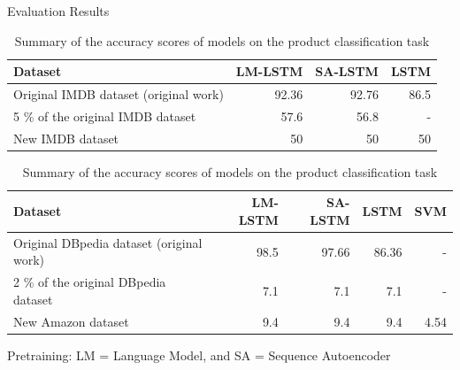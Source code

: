 \documentclass[aspectratio=169,xcolor=dvipsnames]{beamer}
\begin{document}
\begin{frame}{Evaluation Results}
    \tableofcontents

\begin{table}[h!]
    \begin{center}
    
    \caption{Summary of the accuracy scores of models on the IMDB sentiment classification task}
    \label{tab:table1}
    \begin{tabular}{|l|r|r|r|} %
      \hline
      \textbf{Dataset} & \textbf{LM-LSTM} & \textbf{SA-LSTM} & \textbf{LSTM} \\
      \hline
      Original IMDB dataset (original work) & 92.36 & 92.76 & 86.5 \\
      5 \% of the original IMDB dataset & 57.6 & 56.8 & - \\
      New IMDB dataset & 50 & 50 & 50 \\
      \hline
    \end{tabular}
    
    \caption{Summary of the accuracy scores of models on the product classification task}
    \label{tab:table2}
    \begin{tabular}{|l|r|r|r|r|} 
      \hline
      \textbf{Dataset} & \textbf{LM-LSTM} & \textbf{SA-LSTM} & \textbf{LSTM} & \textbf{SVM}\\
      \hline
      Original DBpedia dataset (original work) & 98.5 & 97.66 & 86.36 & -\\
      2 \% of the original DBpedia dataset & 7.1 & 7.1 & 7.1 & - \\
      New Amazon dataset & 9.4 & 9.4 & 9.4 & 4.54\\
      \hline
    \end{tabular}
    \break
    \break
    \footnotesize{Pretraining: LM =  Language Model, and SA = Sequence Autoencoder}
  \end{center}
\end{table}

\end{frame}
\end{document}
